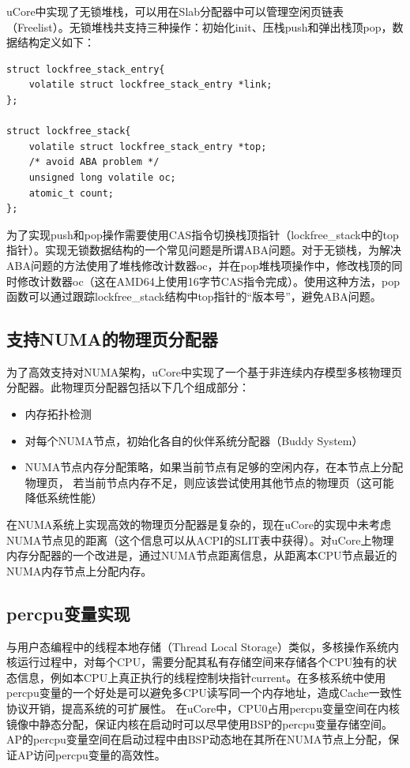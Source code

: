 uCore中实现了无锁堆栈，可以用在Slab分配器中可以管理空闲页链表（Freelist）。无锁堆栈共支持三种操作：初始化init、压栈push和弹出栈顶pop，数据结构定义如下：

\begin{Code}
	\centering
\begin{lstlisting}
struct lockfree_stack_entry{
	volatile struct lockfree_stack_entry *link;
};

struct lockfree_stack{
	volatile struct lockfree_stack_entry *top;
	/* avoid ABA problem */
	unsigned long volatile oc;
	atomic_t count;
};
\end{lstlisting}

\end{Code}
为了实现push和pop操作需要使用CAS指令切换栈顶指针（lockfree\_stack中的top指针）。实现无锁数据结构的一个常见问题是所谓ABA问题\cite{Fraser:2007:CPW:1233307.1233309}。对于无锁栈，为解决ABA问题的方法使用了堆栈修改计数器oc，并在pop堆栈项操作中，修改栈顶的同时修改计数器oc（这在AMD64上使用16字节CAS指令完成）。使用这种方法，pop函数可以通过跟踪lockfree\_stack结构中top指针的``版本号''，避免ABA问题。

\subsection{支持NUMA的物理页分配器}
为了高效支持对NUMA架构，uCore中实现了一个基于非连续内存模型多核物理页分配器。此物理页分配器包括以下几个组成部分：
\begin{itemize}
	\item 内存拓扑检测
	\item 对每个NUMA节点，初始化各自的伙伴系统分配器（Buddy System）
	\item
		NUMA节点内存分配策略，如果当前节点有足够的空闲内存，在本节点上分配物理页，
		若当前节点内存不足，则应该尝试使用其他节点的物理页（这可能降低系统性能）
\end{itemize}

在NUMA系统上实现高效的物理页分配器是复杂的，现在uCore的实现中未考虑NUMA节点见的距离（这个信息可以从ACPI的SLIT表中获得）。对uCore上物理内存分配器的一个改进是，通过NUMA节点距离信息，从距离本CPU节点最近的NUMA内存节点上分配内存。

\subsection{percpu变量实现}
\label{subsec:percpu}

与用户态编程中的线程本地存储（Thread Local Storage）类似，多核操作系统内核运行过程中，对每个CPU，需要分配其私有存储空间来存储各个CPU独有的状态信息，例如本CPU上真正执行的线程控制块指针current。在多核系统中使用percpu变量的一个好处是可以避免多CPU读写同一个内存地址，造成Cache一致性协议开销，提高系统的可扩展性。
在uCore中，CPU0占用percpu变量空间在内核镜像中静态分配，保证内核在启动时可以尽早使用BSP的percpu变量存储空间。AP的percpu变量空间在启动过程中由BSP动态地在其所在NUMA节点上分配，保证AP访问percpu变量的高效性。



